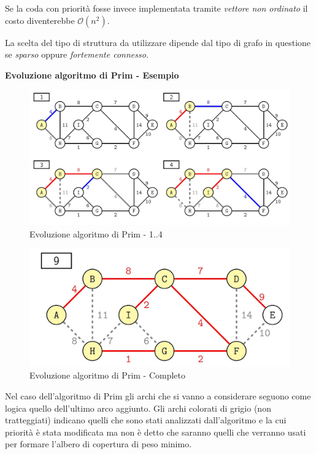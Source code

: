 \documentclass[../cheatSheetAlgoritmi.tex]{subfiles}
\begin{document}
Se la coda con priorità fosse invece implementata tramite \emph{vettore non ordinato} il costo diventerebbe $\mathcal{O}(n^{2})$.

La scelta del tipo di struttura da utilizzare dipende dal tipo di grafo in questione se \emph{sparso} oppure \emph{fortemente connesso}.

\bigskip

\textbf{Evoluzione algoritmo di Prim - Esempio}
\begin{center}
	\begin{figure}[H]
		\includegraphics[width=\linewidth]{../img/Greedy_9.jpg}
		\caption{Evoluzione algoritmo di Prim - 1..4}
	\end{figure}
\end{center}
\begin{center}
	\begin{figure}[H]
		\includegraphics[width=\linewidth]{../img/Greedy_10.jpg}
		\caption{Evoluzione algoritmo di Prim - Completo}
	\end{figure}
\end{center}

Nel caso dell'algoritmo di Prim gli archi che si vanno a considerare seguono come logica quello dell'ultimo arco aggiunto. Gli archi colorati di grigio (non tratteggiati) indicano quelli che sono stati analizzati dall'algoritmo e la cui priorità è stata modificata ma non è detto che saranno quelli che verranno usati per formare l'albero di copertura di peso minimo.
\newpage
\end{document}
